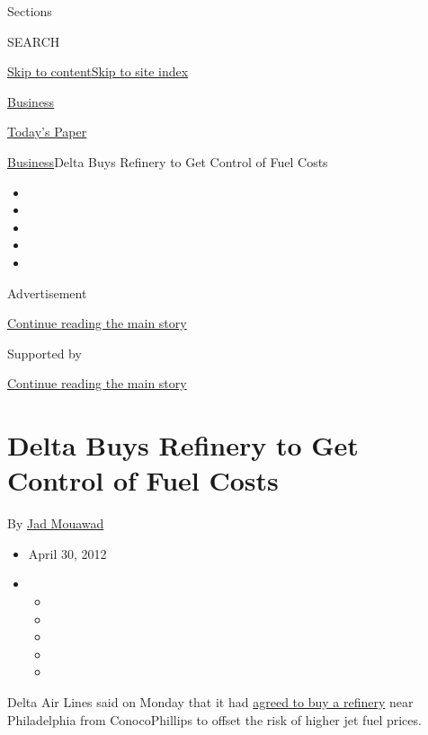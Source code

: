 Sections

SEARCH

\protect\hyperlink{site-content}{Skip to
content}\protect\hyperlink{site-index}{Skip to site index}

\href{https://www.nytimes3xbfgragh.onion/section/business}{Business}

\href{https://myaccount.nytimes3xbfgragh.onion/auth/login?response_type=cookie\&client_id=vi}{}

\href{https://www.nytimes3xbfgragh.onion/section/todayspaper}{Today's
Paper}

\href{/section/business}{Business}\textbar{}Delta Buys Refinery to Get
Control of Fuel Costs

\begin{itemize}
\item
\item
\item
\item
\item
\end{itemize}

Advertisement

\protect\hyperlink{after-top}{Continue reading the main story}

Supported by

\protect\hyperlink{after-sponsor}{Continue reading the main story}

\hypertarget{delta-buys-refinery-to-get-control-of-fuel-costs}{%
\section{Delta Buys Refinery to Get Control of Fuel
Costs}\label{delta-buys-refinery-to-get-control-of-fuel-costs}}

By \href{https://www.nytimes3xbfgragh.onion/by/jad-mouawad}{Jad Mouawad}

\begin{itemize}
\item
  April 30, 2012
\item
  \begin{itemize}
  \item
  \item
  \item
  \item
  \item
  \end{itemize}
\end{itemize}

Delta Air Lines said on Monday that it had
\href{http://news.delta.com/index.php?s=43\&item=1601}{agreed to buy a
refinery} near Philadelphia from ConocoPhillips to offset the risk of
higher jet fuel prices.

